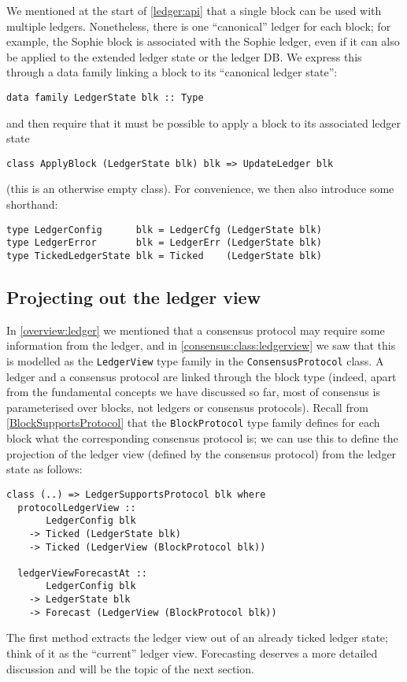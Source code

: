 We mentioned at the start of \cref{ledger:api} that a single block can be used
with multiple ledgers. Nonetheless, there is one ``canonical'' ledger for each
block; for example, the Sophie block is associated with the Sophie ledger,
even if it can also be applied to the extended ledger state or the ledger
DB. We express this through a data family linking a block to its ``canonical
ledger state'':
%
\begin{lstlisting}
data family LedgerState blk :: Type
\end{lstlisting}
%
and then require that it must be possible to apply a block to its associated
ledger state
%
\begin{lstlisting}
class ApplyBlock (LedgerState blk) blk => UpdateLedger blk
\end{lstlisting}
%
(this is an otherwise empty class). For convenience, we then also introduce
some shorthand:
%
\begin{lstlisting}
type LedgerConfig      blk = LedgerCfg (LedgerState blk)
type LedgerError       blk = LedgerErr (LedgerState blk)
type TickedLedgerState blk = Ticked    (LedgerState blk)
\end{lstlisting}

\subsection{Projecting out the ledger view}
\label{ledger:api:LedgerSupportsProtocol}

In \cref{overview:ledger} we mentioned that a consensus protocol may require
some information from the ledger, and in \cref{consensus:class:ledgerview} we
saw that this is modelled as the \lstinline!LedgerView! type family in the
\lstinline!ConsensusProtocol! class. A ledger and a consensus protocol are
linked through the block type (indeed, apart from the fundamental concepts we
have discussed so far, most of consensus is parameterised over blocks, not
ledgers or consensus protocols). Recall from \cref{BlockSupportsProtocol} that
the \lstinline!BlockProtocol! type family defines for each block what the
corresponding consensus protocol is; we can use this to define the projection of
the ledger view (defined by the consensus protocol) from the ledger state as
follows:
%
\begin{lstlisting}
class (..) => LedgerSupportsProtocol blk where
  protocolLedgerView ::
       LedgerConfig blk
    -> Ticked (LedgerState blk)
    -> Ticked (LedgerView (BlockProtocol blk))

  ledgerViewForecastAt ::
       LedgerConfig blk
    -> LedgerState blk
    -> Forecast (LedgerView (BlockProtocol blk))
\end{lstlisting}
%
The first method extracts the ledger view out of an already ticked ledger state;
think of it as the ``current'' ledger view. Forecasting deserves a more detailed
discussion and will be the topic of the next section.

